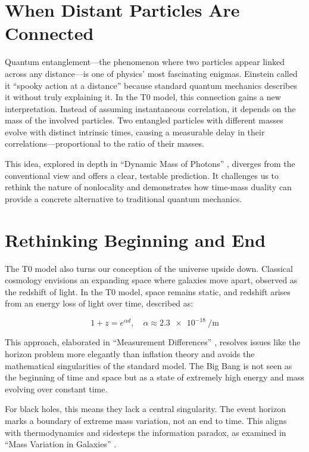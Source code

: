 \documentclass[a4paper,12pt]{article}
\begin{document}
	\section{When Distant Particles Are Connected}
	
	Quantum entanglement—the phenomenon where two particles appear linked across any distance—is one of physics’ most fascinating enigmas. Einstein called it “spooky action at a distance” because standard quantum mechanics describes it without truly explaining it. In the T0 model, this connection gains a new interpretation. Instead of assuming instantaneous correlation, it depends on the mass of the involved particles. Two entangled particles with different masses evolve with distinct intrinsic times, causing a measurable delay in their correlations—proportional to the ratio of their masses.
	
	This idea, explored in depth in “Dynamic Mass of Photons” \cite{pascher_photons_2025}, diverges from the conventional view and offers a clear, testable prediction. It challenges us to rethink the nature of nonlocality and demonstrates how time-mass duality can provide a concrete alternative to traditional quantum mechanics.
	
	\section{Rethinking Beginning and End}
	
	The T0 model also turns our conception of the universe upside down. Classical cosmology envisions an expanding space where galaxies move apart, observed as the redshift of light. In the T0 model, space remains static, and redshift arises from an energy loss of light over time, described as:
	
	\begin{equation}
		1 + z = e^{\alpha d}, \quad \alpha \approx \SI{2.3e-18}{\per\meter}
	\end{equation}
	
	This approach, elaborated in “Measurement Differences” \cite{pascher_messdifferenzen_2025}, resolves issues like the horizon problem more elegantly than inflation theory and avoids the mathematical singularities of the standard model. The Big Bang is not seen as the beginning of time and space but as a state of extremely high energy and mass evolving over constant time.
	
	For black holes, this means they lack a central singularity. The event horizon marks a boundary of extreme mass variation, not an end to time. This aligns with thermodynamics and sidesteps the information paradox, as examined in “Mass Variation in Galaxies” \cite{pascher_galaxies_2025}.
	
\end{document}

